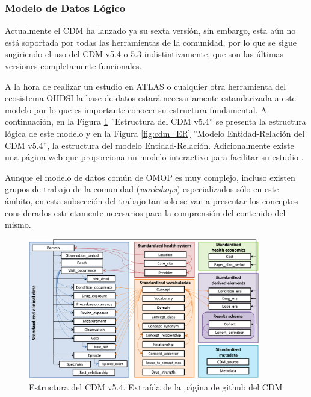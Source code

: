 \subsubsection{Modelo de Datos Lógico}

Actualmente el CDM ha lanzado ya su sexta versión, sin embargo, esta aún no está soportada por todas las herramientas de la comunidad, por lo que se sigue sugiriendo el uso del CDM v5.4 o 5.3 indistintivamente, que son las últimas versiones completamente funcionales. 

A la hora de realizar un estudio en ATLAS o cualquier otra herramienta del ecosistema OHDSI la base de datos estará necesariamente estandarizada a este modelo por lo que es importante conocer su estructura fundamental. A continuación, en la Figura \ref{fig:cdm54} ''Estructura del CDM v5.4'' se presenta la estructura lógica de este modelo y en la Figura \ref{fig:cdm_ER} ''Modelo Entidad-Relación del CDM v5.4'', la estructura del modelo Entidad-Relación. Adicionalmente existe una página web que proporciona un modelo interactivo para facilitar su estudio \cite{CDMinteractive}.

Aunque el modelo de datos común de OMOP es muy complejo, incluso existen grupos de trabajo de la comunidad (\textit{workshops}) especializados sólo en este ámbito, en esta subsección del trabajo tan solo se van a presentar los conceptos considerados estrictamente necesarios para la comprensión del contenido del mismo.

\begin{figure}[H]
    \centering
    \includegraphics[width=0.90\textwidth]{figures/cdm54.png}
     \caption{Estructura del CDM v5.4. Extraída de la página de github del CDM \cite{gitPagesCMD}}
    \label{fig:cdm54}
\end{figure}

